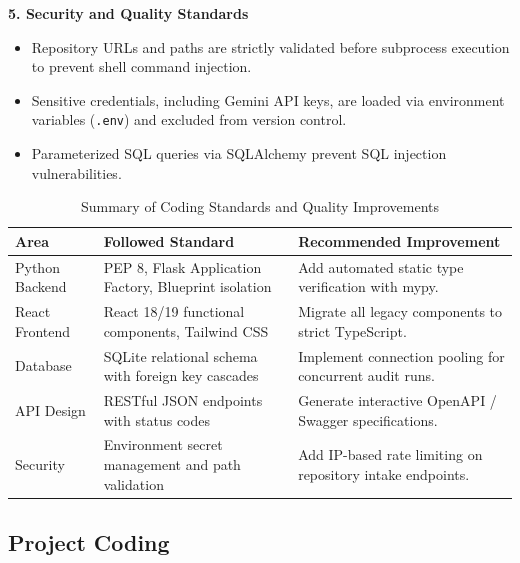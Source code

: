 \documentclass[12pt,a4paper]{article}
\begin{document}
\begin{spacing}{1.3}
\textbf{5. Security and Quality Standards}
\begin{itemize}[leftmargin=*,itemsep=3pt,topsep=3pt]
    \item Repository URLs and paths are strictly validated before subprocess execution to prevent shell command injection.
    \item Sensitive credentials, including Gemini API keys, are loaded via environment variables (\texttt{.env}) and excluded from version control.
    \item Parameterized SQL queries via SQLAlchemy prevent SQL injection vulnerabilities.
\end{itemize}

\end{spacing}

\begin{table}[H]
\centering
\caption{Summary of Coding Standards and Quality Improvements}
\label{tab:coding_standards}
\renewcommand{\arraystretch}{1.35}
\setlength{\tabcolsep}{6pt}
\small

\begin{tabularx}{\linewidth}{|>{\raggedright\arraybackslash}p{1.4in}|Y|Y|}
\hline
\textbf{Area} & \textbf{Followed Standard} & \textbf{Recommended Improvement} \\
\hline
Python Backend & PEP 8, Flask Application Factory, Blueprint isolation & Add automated static type verification with mypy. \\
\hline
React Frontend & React 18/19 functional components, Tailwind CSS & Migrate all legacy components to strict TypeScript. \\
\hline
Database & SQLite relational schema with foreign key cascades & Implement connection pooling for concurrent audit runs. \\
\hline
API Design & RESTful JSON endpoints with status codes & Generate interactive OpenAPI / Swagger specifications. \\
\hline
Security & Environment secret management and path validation & Add IP-based rate limiting on repository intake endpoints. \\
\hline
\end{tabularx}
\end{table}

\subsection{Project Coding}
\end{document}
